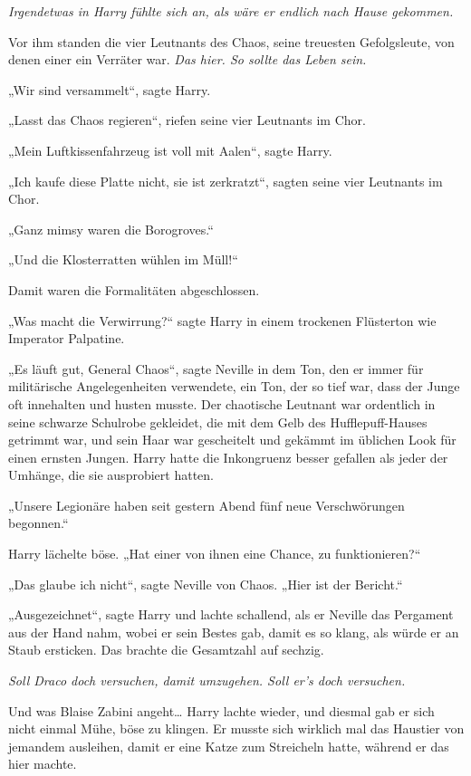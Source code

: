 {\emph{Irgendetwas in Harry fühlte sich an, als wäre er endlich nach Hause gekommen.}

Vor ihm standen die vier Leutnants des Chaos, seine treuesten Gefolgsleute, von denen einer ein Verräter war. \emph{Das hier. So sollte das Leben sein.}

„Wir sind versammelt“, sagte Harry.

„Lasst das Chaos regieren“, riefen seine vier Leutnants im Chor.

„Mein Luftkissenfahrzeug ist voll mit Aalen“, sagte Harry.

„Ich kaufe diese Platte nicht, sie ist zerkratzt“, sagten seine vier Leutnants im Chor.

„Ganz mimsy waren die Borogroves.“

„Und die Klosterratten wühlen im Müll!“

Damit waren die Formalitäten abgeschlossen.

„Was macht die Verwirrung?“ sagte Harry in einem trockenen Flüsterton wie Imperator Palpatine.

„Es läuft gut, General Chaos“, sagte Neville in dem Ton, den er immer für militärische Angelegenheiten verwendete, ein Ton, der so tief war, dass der Junge oft innehalten und husten musste. Der chaotische Leutnant war ordentlich in seine schwarze Schulrobe gekleidet, die mit dem Gelb des Hufflepuff-Hauses getrimmt war, und sein Haar war gescheitelt und gekämmt im üblichen Look für einen ernsten Jungen. Harry hatte die Inkongruenz besser gefallen als jeder der Umhänge, die sie ausprobiert hatten.

„Unsere Legionäre haben seit gestern Abend fünf neue Verschwörungen begonnen.“

Harry lächelte böse. „Hat einer von ihnen eine Chance, zu funktionieren?“

„Das glaube ich nicht“, sagte Neville von Chaos. „Hier ist der Bericht.“

„Ausgezeichnet“, sagte Harry und lachte schallend, als er Neville das Pergament aus der Hand nahm, wobei er sein Bestes gab, damit es so klang, als würde er an Staub ersticken. Das brachte die Gesamtzahl auf sechzig.

\emph{Soll Draco doch versuchen, damit umzugehen. Soll er's doch versuchen.}

Und was Blaise Zabini angeht… Harry lachte wieder, und diesmal gab er sich nicht einmal Mühe, böse zu klingen. Er musste sich wirklich mal das Haustier von jemandem ausleihen, damit er eine Katze zum Streicheln hatte, während er das hier machte.

}
